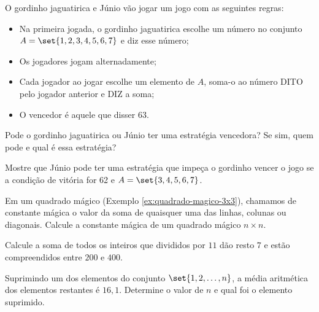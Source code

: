 \begin{exercise}
    O gordinho jaguatirica e Júnio vão jogar um  jogo com as
seguintes regras:
\begin{itemize}
  \item Na primeira jogada, o gordinho jaguatirica escolhe um número no
  conjunto $A = \set{1, 2, 3, 4, 5, 6, 7}$ e diz esse número;
  \item Os jogadores jogam alternadamente;
  \item Cada jogador ao jogar escolhe um elemento de $A$, soma-o ao
  número DITO pelo jogador anterior e DIZ a soma;
  \item O vencedor é aquele que disser 63.
\end{itemize}
Pode o gordinho jaguatirica ou Júnio ter uma estratégia vencedora?
Se sim, quem pode e qual é essa estratégia?
\end{exercise}



\begin{exercise}
    Mostre que Júnio pode ter uma estratégia que impeça o gordinho
vencer o jogo se a condição de vitória for 62 e $A =\set{3, 4, 5, 6,
7}$. 
\end{exercise}

\begin{exercise}
    Em um quadrado mágico (Exemplo \ref{ex:quadrado-magico-3x3}),
chamamos de constante mágica o valor da soma de quaisquer uma das
linhas, colunas ou diagonais. Calcule a constante mágica de um
quadrado mágico $n \times n$.
\end{exercise}

\begin{exercise}
    Calcule a soma de todos os inteiros que divididos por $11$ dão resto $7$ e estão compreendidos entre $200$ e $400$.
\end{exercise}


\begin{exercise}
Suprimindo um dos elementos do conjunto $\set{1, 2, \dots , n}$,
a média aritmética dos elementos restantes é $16{,}1$. Determine o
valor de $n$ e qual foi o elemento suprimido.    
\end{exercise}


